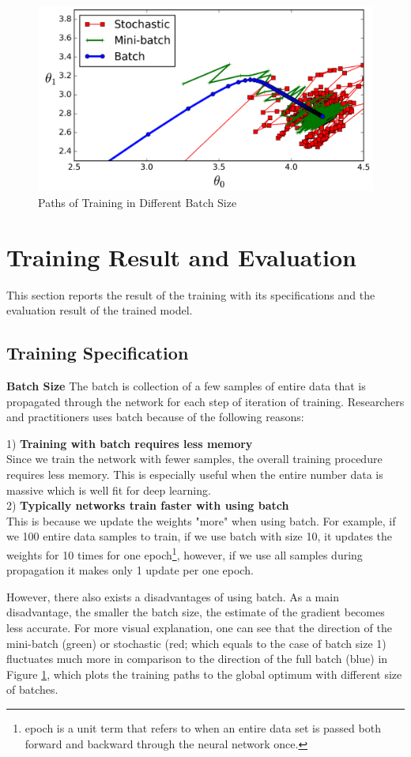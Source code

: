 \documentclass[sigconf]{acmart}
\begin{document}
\begin{figure}
  \includegraphics[width=\linewidth]{batch.png}
  \caption{Paths of Training in Different Batch Size \cite{sgd}}
  \label{BatchFig}
\end{figure}

\section{Training Result and Evaluation}
This section reports the result of the training with its specifications and the evaluation result of the trained model.
\subsection{Training Specification} 
\textbf{Batch Size} The batch is collection of a few samples of entire data that is propagated through the network for each step of iteration of training. Researchers and practitioners uses batch because of the following reasons: \\
\begin{displayquote}
1) \textbf{Training with batch requires less memory}\\
Since we train the network with fewer samples, the overall training procedure requires less memory. This is especially useful when the entire number data is massive which is well fit for deep learning.\\

2) \textbf{Typically networks train faster with using batch}\\This is because we update the weights "more" when using batch. For example, if we 100 entire data samples to train, if we use batch with size 10, it updates the weights for 10 times for one epoch\footnote{epoch is a unit term that refers to when an entire data set is passed both forward and backward through the neural network once.}, however, if we use all samples during propagation it makes only 1 update per one epoch.  
\end{displayquote}
However, there also exists a disadvantages of using batch. As a main disadvantage, the smaller the batch size, the estimate of the gradient becomes less accurate. For more visual explanation, one can see that the direction of the mini-batch (green) or stochastic (red; which equals to the case of batch size 1) fluctuates much more in comparison to the direction of the full batch (blue) in Figure \ref{BatchFig}, which plots the training paths to the global optimum with different size of batches.
\end{document}
